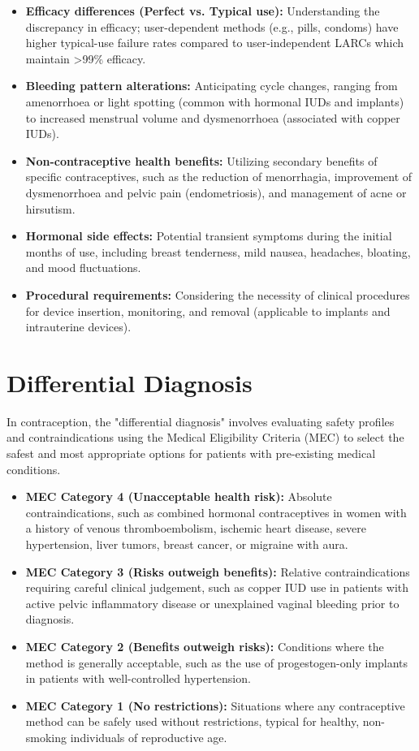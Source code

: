 \begin{itemize}
    \item \textbf{Efficacy differences (Perfect vs. Typical use):} Understanding the discrepancy in efficacy; user-dependent methods (e.g., pills, condoms) have higher typical-use failure rates compared to user-independent LARCs which maintain >99\% efficacy.
    \item \textbf{Bleeding pattern alterations:} Anticipating cycle changes, ranging from amenorrhoea or light spotting (common with hormonal IUDs and implants) to increased menstrual volume and dysmenorrhoea (associated with copper IUDs).
    \item \textbf{Non-contraceptive health benefits:} Utilizing secondary benefits of specific contraceptives, such as the reduction of menorrhagia, improvement of dysmenorrhoea and pelvic pain (endometriosis), and management of acne or hirsutism.
    \item \textbf{Hormonal side effects:} Potential transient symptoms during the initial months of use, including breast tenderness, mild nausea, headaches, bloating, and mood fluctuations.
    \item \textbf{Procedural requirements:} Considering the necessity of clinical procedures for device insertion, monitoring, and removal (applicable to implants and intrauterine devices).
\end{itemize}

\section*{Differential Diagnosis}
In contraception, the "differential diagnosis" involves evaluating safety profiles and contraindications using the Medical Eligibility Criteria (MEC) to select the safest and most appropriate options for patients with pre-existing medical conditions.

\begin{itemize}
    \item \textbf{MEC Category 4 (Unacceptable health risk):} Absolute contraindications, such as combined hormonal contraceptives in women with a history of venous thromboembolism, ischemic heart disease, severe hypertension, liver tumors, breast cancer, or migraine with aura.
    \item \textbf{MEC Category 3 (Risks outweigh benefits):} Relative contraindications requiring careful clinical judgement, such as copper IUD use in patients with active pelvic inflammatory disease or unexplained vaginal bleeding prior to diagnosis.
    \item \textbf{MEC Category 2 (Benefits outweigh risks):} Conditions where the method is generally acceptable, such as the use of progestogen-only implants in patients with well-controlled hypertension.
    \item \textbf{MEC Category 1 (No restrictions):} Situations where any contraceptive method can be safely used without restrictions, typical for healthy, non-smoking individuals of reproductive age.
\end{itemize}

